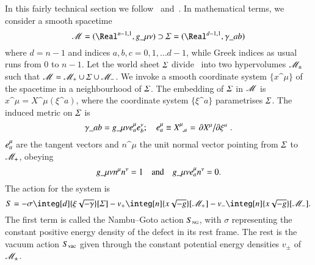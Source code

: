 In this fairly technical section we follow~\citet{garrigaPerturbationsDomainWalls1991} and~\citet{ishibashiEquationMotionDomain1999}. %
In mathematical terms, we consider a smooth spacetime
\begin{equation}
    \Manifold = (\Real^{n-1,1}, g\_{\mu\nu}) \supset \hypsurf=(\Real^{d-1,1}, \gamma\_{ab})
\end{equation}
where $d = n-1$ and indices $a,b,c =0,1,\dots d-1$, while Greek indices as usual runs from 0 to $n-1$. Let the world sheet $\varSigma$ divide \Manifold~into two hypervolumes $\mathscr{M}_{\pm}$ such that $\mathscr{M} = \mathscr{M}_+ \cup  \varSigma \cup \mathscr{M}_-$. 
We invoke a smooth coordinate system $\{x\^\mu\}$ of the spacetime in a neighbourhood of $\varSigma$. The embedding of $\varSigma$ in $\mathscr{M}$ is $x\^\mu = X\^\mu(\xi\^a)$, where the coordinate system $\{\xi\^a\}$ parametrises $\varSigma$. 
The induced metric on $\varSigma$ is
\begin{equation}\label{eq:pertwalls:thinwall:induced_metric}
    \gamma\_{ab} = g\_{\mu\nu} e\indices*{^\mu_{a}} e\indices*{^\nu_{b}}; \quad e\indices*{^\mu_{a}}\equiv X\indices{^\mu_{,a}}= \pdv*{X\^\mu}{\xi\^a}.%
\end{equation}
%
$e\indices*{^\mu_a}$ are the tangent vectors and $n\^\mu$ the unit normal vector pointing from $\varSigma$ to $\mathscr{M}_+$, obeying
\begin{equation}
    g\_{\mu\nu} n\^\mu n\^\nu = 1  \quad \text{and}\quad  g\_{\mu\nu} e\indices*{^\mu_a} n\^\nu = 0.
\end{equation}
The action for the system is~\citep{ishibashiEquationMotionDomain1999}
\begin{equation}\label{eq:pertwalls:eom_wall:total_action}
    S = - \sigma \integ[d]{\xi\sqrt{-\gamma}}[\hypsurf] %
    - v_+ \integ[n]{x\sqrt{-g}}[\mathscr{M}_+] %
    - v_- \integ[n]{x\sqrt{-g}}[\mathscr{M}_-]. %
\end{equation}
The first term is called the Nambu--Goto action $S_{\text{\tiny{NG}}}$, with $\sigma$ representing the constant positive energy density of the defect in its rest frame. The rest is the vacuum action $S_\mathrm{vac}$ given through the constant potential energy densities $v_\pm$ of $\mathscr{M}_\pm$. %


